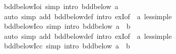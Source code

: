 \begin{isabellebody}
%
\endisadelimproof
\isanewline
{}\isamarkupfalse%
\ bdd{\isacharunderscore}{\kern0pt}below{\isacharunderscore}{\kern0pt}Ioi\ {\isacharbrackleft}{\kern0pt}simp{\isacharcomma}{\kern0pt}\ intro{\isacharbrackright}{\kern0pt}{\isacharcolon}{\kern0pt}\ {\isachardoublequoteopen}bdd{\isacharunderscore}{\kern0pt}below\ {\isacharbraceleft}{\kern0pt}a\ {\isacharless}{\kern0pt}{\isachardot}{\kern0pt}{\isachardot}{\kern0pt}{\isacharbraceright}{\kern0pt}{\isachardoublequoteclose}\isanewline
%
\isadelimproof
\ \ %
\endisadelimproof
%
\isatagproof
{}\isamarkupfalse%
\ {\isacharparenleft}{\kern0pt}auto\ simp\ add{\isacharcolon}{\kern0pt}\ bdd{\isacharunderscore}{\kern0pt}below{\isacharunderscore}{\kern0pt}def\ intro{\isacharcolon}{\kern0pt}\ exI{\isacharbrackleft}{\kern0pt}of\ {\isacharunderscore}{\kern0pt}\ a{\isacharbrackright}{\kern0pt}\ less{\isacharunderscore}{\kern0pt}imp{\isacharunderscore}{\kern0pt}le{\isacharparenright}{\kern0pt}%
\endisatagproof
{\isafoldproof}%
%
\isadelimproof
\isanewline
%
\endisadelimproof
\isanewline
{}\isamarkupfalse%
\ bdd{\isacharunderscore}{\kern0pt}below{\isacharunderscore}{\kern0pt}Ico\ {\isacharbrackleft}{\kern0pt}simp{\isacharcomma}{\kern0pt}\ intro{\isacharbrackright}{\kern0pt}{\isacharcolon}{\kern0pt}\ {\isachardoublequoteopen}bdd{\isacharunderscore}{\kern0pt}below\ {\isacharbraceleft}{\kern0pt}a\ {\isachardot}{\kern0pt}{\isachardot}{\kern0pt}{\isacharless}{\kern0pt}\ b{\isacharbraceright}{\kern0pt}{\isachardoublequoteclose}\isanewline
%
\isadelimproof
\ \ %
\endisadelimproof
%
\isatagproof
{}\isamarkupfalse%
\ {\isacharparenleft}{\kern0pt}auto\ simp\ add{\isacharcolon}{\kern0pt}\ bdd{\isacharunderscore}{\kern0pt}below{\isacharunderscore}{\kern0pt}def\ intro{\isacharcolon}{\kern0pt}\ exI{\isacharbrackleft}{\kern0pt}of\ {\isacharunderscore}{\kern0pt}\ a{\isacharbrackright}{\kern0pt}\ less{\isacharunderscore}{\kern0pt}imp{\isacharunderscore}{\kern0pt}le{\isacharparenright}{\kern0pt}%
\endisatagproof
{\isafoldproof}%
%
\isadelimproof
\isanewline
%
\endisadelimproof
\isanewline
{}\isamarkupfalse%
\ bdd{\isacharunderscore}{\kern0pt}below{\isacharunderscore}{\kern0pt}Icc\ {\isacharbrackleft}{\kern0pt}simp{\isacharcomma}{\kern0pt}\ intro{\isacharbrackright}{\kern0pt}{\isacharcolon}{\kern0pt}\ {\isachardoublequoteopen}bdd{\isacharunderscore}{\kern0pt}below\ {\isacharbraceleft}{\kern0pt}a\ {\isachardot}{\kern0pt}{\isachardot}{\kern0pt}\ b{\isacharbraceright}{\kern0pt}{\isachardoublequoteclose}\isanewline
%
\isadelimproof
\ \ %
\endisadelimproof
%
\isatagproof
{}\isamarkupfalse%

\end{isabellebody}
